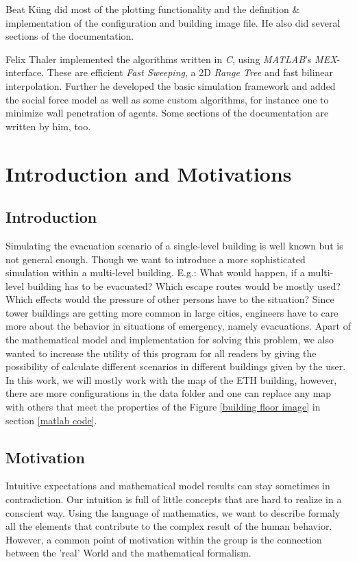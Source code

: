 \documentclass[11pt]{article}
\begin{document}
Beat K\"ung did most of the plotting functionality and the definition \&
implementation of the configuration and building image file. He also did several
sections of the documentation.

Felix Thaler implemented the algorithms written in \textit{C}, using \textit{MATLAB}'s \textit{MEX}-interface.
These are efficient \textit{Fast Sweeping}, a 2D \textit{Range Tree} and fast bilinear interpolation.
Further he developed the basic simulation framework and added the social force model as well as some
custom algorithms, for instance one to minimize wall penetration of agents. Some sections of the documentation are
written by him, too.


\section{Introduction and Motivations}

\subsection{Introduction}

Simulating the evacuation scenario of a single-level building is well known but
is not general enough. Though we want to introduce a more sophisticated
simulation within a multi-level building. E.g.: What would happen, if a
multi-level building has to be evacuated? Which escape routes would be mostly
used? Which effects would the pressure of other persons have to the
situation? Since tower buildings are getting more common in large cities,
engineers have to care more about the behavior in situations of emergency,
namely evacuations. Apart of the mathematical model and implementation for
solving this problem, we also wanted to increase the utility of this program for
all readers by giving the possibility of calculate different scenarios in
different buildings given by the user. In this work, we will mostly work with
the map of the ETH building, however, there are more configurations in the data
folder and one can replace any map with others that meet the properties of the
Figure \ref{building floor image} in section \ref{matlab code}.

\subsection{Motivation}

Intuitive expectations and mathematical model results can stay sometimes in
contradiction. Our intuition is full of little concepts that are hard to realize
in a conscient way.  Using the language of mathematics, we want to describe
formaly all the elements that contribute to the complex result of the human
behavior. However, a common point of motivation within the group is the
connection between the 'real' World and the mathematical formalism.
\end{document}
